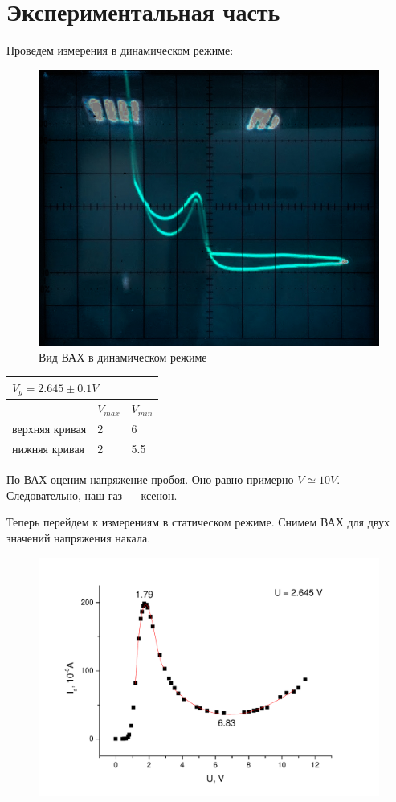 \documentclass[a4paper,12pt]{article}
\begin{document}
	\section{Экспериментальная часть}
		Проведем измерения в динамическом режиме:
		\begin{figure}[h!]
			\centering
			\includegraphics[width=0.4\linewidth]{pic1}
			\caption{Вид ВАХ в динамическом режиме}
		\end{figure}
		
		\begin{table}[h!]
			\centering
			\label{my-label}
			\begin{tabular}{|l|l|l|}
				\multicolumn{3}{l}{$V_g = 2.645 \pm 0.1 V $} \\ \hline
				& $V_{max}$ & $V_{min}$ \\ \hline
				верхняя кривая    &  2  & 6    \\ \hline
				нижняя кривая  &  2  &  5.5       \\ \hline
			\end{tabular}
		\end{table}
		
		По ВАХ оценим напряжение пробоя. Оно равно примерно $V \simeq 10 V$. Следовательно, наш газ --- ксенон.
		
		Теперь перейдем к измерениям в статическом режиме. Снимем ВАХ для двух значений напряжения накала.
		
		\begin{figure}[h!]
			\centering
			\includegraphics[width=0.7\linewidth]{graph1}
		\end{figure}
		
\end{document}
